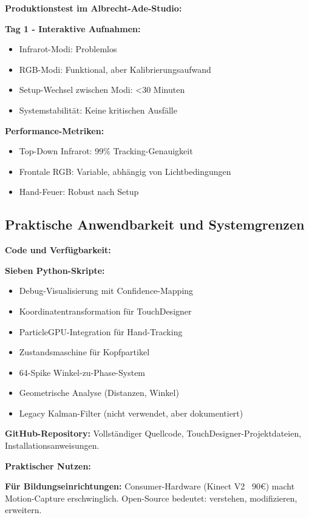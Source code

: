 \textbf{Produktionstest im Albrecht-Ade-Studio:}

\textbf{Tag 1 - Interaktive Aufnahmen:}
\begin{itemize}
    \item Infrarot-Modi: Problemlos
    \item RGB-Modi: Funktional, aber Kalibrierungsaufwand
    \item Setup-Wechsel zwischen Modi: <30 Minuten
    \item Systemstabilität: Keine kritischen Ausfälle
\end{itemize}

\textbf{Performance-Metriken:}
\begin{itemize}
    \item Top-Down Infrarot: 99\% Tracking-Genauigkeit
    \item Frontale RGB: Variable, abhängig von Lichtbedingungen
    \item Hand-Feuer: Robust nach Setup
\end{itemize}

\subsection{Praktische Anwendbarkeit und Systemgrenzen}

\textbf{Code und Verfügbarkeit:}

\textbf{Sieben Python-Skripte:}
\begin{itemize}
    \item Debug-Visualisierung mit Confidence-Mapping
    \item Koordinatentransformation für TouchDesigner
    \item ParticleGPU-Integration für Hand-Tracking
    \item Zustandsmaschine für Kopfpartikel
    \item 64-Spike Winkel-zu-Phase-System
    \item Geometrische Analyse (Distanzen, Winkel)
    \item Legacy Kalman-Filter (nicht verwendet, aber dokumentiert)
\end{itemize}

\textbf{GitHub-Repository:} Vollständiger Quellcode, TouchDesigner-Projektdateien, Installationsanweisungen.

\textbf{Praktischer Nutzen:}

\textbf{Für Bildungseinrichtungen:}
Consumer-Hardware (Kinect V2 ~90€) macht Motion-Capture erschwinglich. Open-Source bedeutet: verstehen, modifizieren, erweitern.

